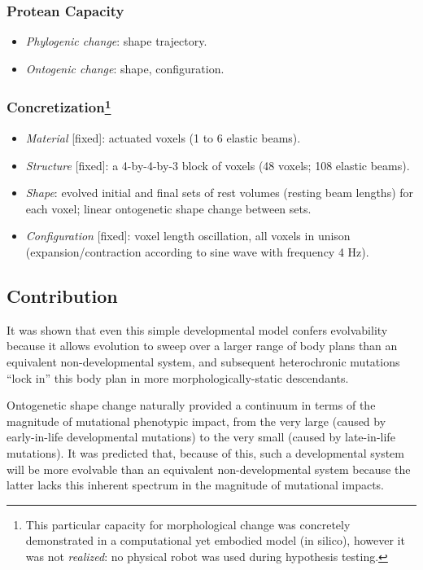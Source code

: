 \subsubsection*{Protean Capacity}

\begin{itemize}
    \item \textit{Phylogenic change}: shape trajectory.
    \item \textit{Ontogenic change}: shape, configuration.
\end{itemize}

\subsubsection*{Concretization\footnote{This particular capacity for morphological change was concretely demonstrated in a computational yet embodied model (in silico), however it was not \textit{realized}: no physical robot was used during hypothesis testing.}}

\begin{itemize}
    \item \textit{Material} [fixed]: actuated voxels (1 to 6 elastic beams).
    \item \textit{Structure} [fixed]: a 4-by-4-by-3 block of voxels (48 voxels; 108 elastic beams).
    \item \textit{Shape}: evolved initial and final sets of rest volumes (resting beam lengths) for each voxel; linear ontogenetic shape change between sets.
    \item \textit{Configuration} [fixed]: voxel length oscillation, all voxels in unison (expansion/contraction according to sine wave with frequency 4 Hz).
\end{itemize}


\subsection{Contribution}


It was shown that even this simple developmental model confers evolvability 
because it allows evolution to sweep over a larger range of body plans than an equivalent non-developmental system, and subsequent heterochronic mutations
``lock in'' this body plan in more morphologically-static descendants.

Ontogenetic shape change
naturally provided
a continuum in terms of the magnitude of mutational phenotypic impact,
from the very large (caused by early-in-life developmental mutations) 
to the very small (caused by late-in-life mutations). 
It was predicted that,
because of this, such a developmental system will be more evolvable than an equivalent non-developmental system because the latter lacks this inherent spectrum in the magnitude of mutational impacts.

